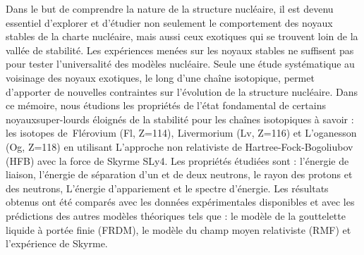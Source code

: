 

Dans le but de comprendre la nature de la structure nucléaire, il est devenu essentiel d'explorer et
d'étudier non seulement le comportement des noyaux stables de la charte nucléaire, mais aussi ceux exotiques qui se
trouvent loin de la vallée de stabilité. Les expériences menées sur les noyaux stables ne suffisent pas pour tester
l'universalité des modèles nucléaire. Seule une étude systématique au voisinage des noyaux exotiques, le long d'une
chaîne isotopique, permet d'apporter de nouvelles contraintes sur l'évolution de la structure nucléaire.
 Dans ce mémoire, nous étudions les propriétés de l'état fondamental de certains noyauxsuper-lourds
éloignés de la stabilité pour les chaînes isotopiques à savoir : les isotopes
de\textcolor[rgb]{0.1254902,0.12941177,0.13333334}{~Flérovium} (Fl,
Z=114),\textbf{\textcolor[rgb]{0.1254902,0.12941177,0.13333334}{
}}\textcolor[rgb]{0.1254902,0.12941177,0.13333334}{Livermorium }(Lv, Z=116) et L'oganesson (Og, Z=118) en utilisant
L'approche non relativiste de Hartree-Fock-Bogoliubov (HFB) avec la force de Skyrme SLy4. Les propriétés étudiées sont
: l'énergie de liaison, l'énergie de séparation d'un et de deux neutrons, le rayon des protons et des neutrons,
L'énergie d'appariement et le spectre d'énergie. Les résultats obtenus ont été comparés avec les données expérimentales
disponibles et avec les prédictions des autres modèles théoriques tels que : le modèle de la gouttelette liquide à
portée finie (FRDM), le modèle du champ moyen relativiste (RMF) et l'expérience de Skyrme.



